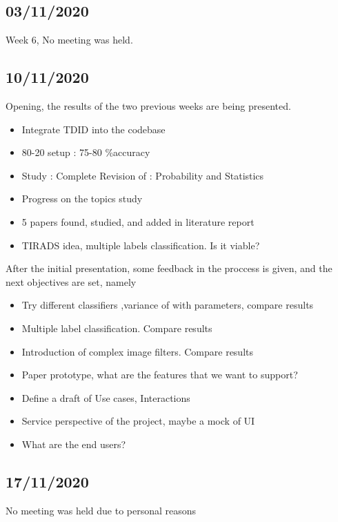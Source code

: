\documentclass[openany]{article}
\begin{document}
		\subsection{03/11/2020}
			Week 6, No meeting was held.
		\subsection{10/11/2020}
			Opening, the results of the two previous weeks are being presented.
			\begin{itemize}
				\item Integrate TDID into the codebase
				\item 80-20 setup : 75-80 \%accuracy
				\item Study : Complete Revision of : Probability and Statistics
				\item Progress on the topics study
				\item 5 papers found, studied, and added in literature report
				\item TIRADS idea, multiple labels classification. Is it viable?
			\end{itemize}	
			After the initial presentation, some feedback in the proccess is given, and the next objectives are set, namely
			\begin{itemize}
				\item Try different classifiers ,variance of with parameters, compare results
				\item Multiple label classification. Compare results
				\item Introduction of complex image filters. Compare results
				\item Paper prototype, what are the features that we want to support?
				\item Define a draft of Use cases, Interactions
				\item Service perspective of the project, maybe a mock of UI
				\item What are the end users?
			\end{itemize}
		\subsection{17/11/2020}
			No meeting was held due to personal reasons
\end{document}
